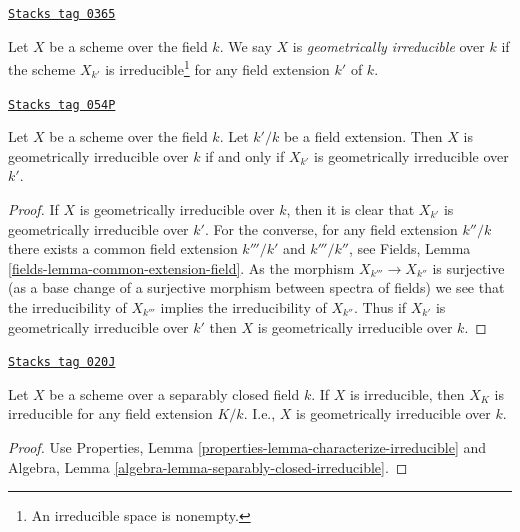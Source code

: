\begin{definition}
\label{varieties-definition-geometrically-irreducible}
\href{https://stacks.math.columbia.edu/tag/0365}{\texttt{Stacks tag 0365}}

Let $X$ be a scheme over the field $k$.
We say $X$ is {\it geometrically irreducible} over $k$ if the scheme
$X_{k'}$ is irreducible\footnote{An irreducible space is nonempty.}
for any field extension $k'$ of $k$.
\end{definition}

\begin{lemma}
\label{varieties-lemma-geometrically-irreducible-check-after-extension}
\href{https://stacks.math.columbia.edu/tag/054P}{\texttt{Stacks tag 054P}}

Let $X$ be a scheme over the field $k$.
Let $k'/k$ be a field extension.
Then $X$ is geometrically irreducible over $k$ if and only if
$X_{k'}$ is geometrically irreducible over $k'$.
\end{lemma}

\begin{proof}
If $X$ is geometrically irreducible over $k$, then it is clear that
$X_{k'}$ is geometrically irreducible over $k'$. For the converse,
for any field extension $k''/k$ there exists a common
field extension $k'''/k'$ and $k'''/k''$, see Fields, Lemma
\ref{fields-lemma-common-extension-field}. As the
morphism $X_{k'''} \to X_{k''}$ is surjective (as a base change of
a surjective morphism between spectra of fields) we see that the
irreducibility of $X_{k'''}$ implies the irreducibility of $X_{k''}$.
Thus if $X_{k'}$ is geometrically irreducible over $k'$ then
$X$ is geometrically irreducible over $k$.
\end{proof}

\begin{lemma}
\label{varieties-lemma-separably-closed-irreducible}
\href{https://stacks.math.columbia.edu/tag/020J}{\texttt{Stacks tag 020J}}

Let $X$ be a scheme over a separably closed field $k$.
If $X$ is irreducible, then $X_K$ is irreducible for any
field extension $K/k$. I.e., $X$ is geometrically
irreducible over $k$.
\end{lemma}

\begin{proof}
Use Properties, Lemma \ref{properties-lemma-characterize-irreducible}
and Algebra, Lemma \ref{algebra-lemma-separably-closed-irreducible}.
\end{proof}

